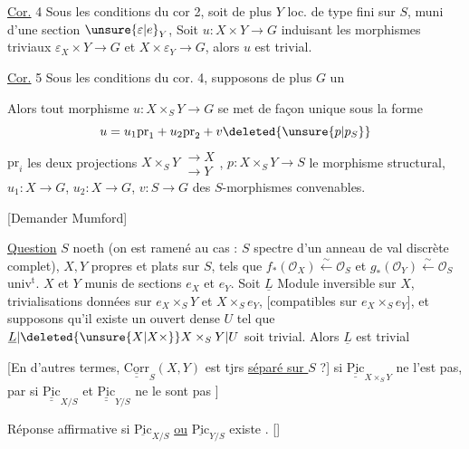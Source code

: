 \uline{Cor.} 4 \quad Sous les conditions du cor 2, soit de plus $Y$ loc. de type fini sur $S$,  muni d'une section $\unsure{\varepsilon|e}_Y$, Soit $u:X\times Y\to G$ induisant les morphismes triviaux $\varepsilon_X\times Y\to G$ et $X\times\varepsilon_Y\to G$, alors $u$ est trivial.

\uline{Cor.} 5  Sous les conditions du cor. 4, supposons de plus $G$ un 

Alors tout morphisme $u:X\times_S Y\to G$ se met de façon unique sous la forme
\[
u=u_1\mathrm{pr}_1+u_2\mathrm{pr}_2+v\deleted{\unsure{p|p_S}}
\]
$\mathrm{pr}_i$ les deux projections $X\times_S Y\substack{\longrightarrow X\\\longrightarrow Y}$, $p:X\times_S Y\to S$ le morphisme structural, $u_1:X\to G$, $u_2:X\to G$, $v:S\to G$ des $S$-morphismes convenables.

[Demander Mumford]

\uline{Question} $S$ noeth (on est ramené au cas : $S$ spectre d'un anneau de val discrète  complet), $X,Y$ propres et plats sur $S$, tels que $f_*(\mathcal O_X)\xleftarrow{\sim}\mathcal O_S$ et $g_*(\mathcal O_Y)\xleftarrow{\sim}\mathcal O_S$ univ$^{\mathrm t}$. $X$ et $Y$ munis de sections $e_X$ et $e_Y$. Soit $\underline L$ Module inversible sur $X$,  trivialisations données sur $e_X\times_S Y$ et $X\times_S e_Y$, [compatibles sur $e_X\times_S e_Y$], et supposons qu'il existe un ouvert dense $U$ tel que $\underline L|\deleted{\unsure{X|X\times}}X\times_S Y|U$ soit trivial. Alors $\underline L$ est trivial

[En d'autres termes, $\underline{\underline{\mathrm{Corr}}}_S(X,Y)$ est tjrs \uline{séparé sur $S$} ?]  si  $\underline{\underline{\mathrm{Pic}}}_{X\times_S Y}$ ne l'est pas, par  si $\underline{\underline{\mathrm{Pic}}}_{X/S}$ et $\underline{\underline{\mathrm{Pic}}}_{Y/S}$ ne le sont pas ]

Réponse affirmative si $\underline{\mathrm{Pic}}_{X/S}$ \uline{ou} $\underline{\mathrm{Pic}}_{Y/S}$ existe . [] 
